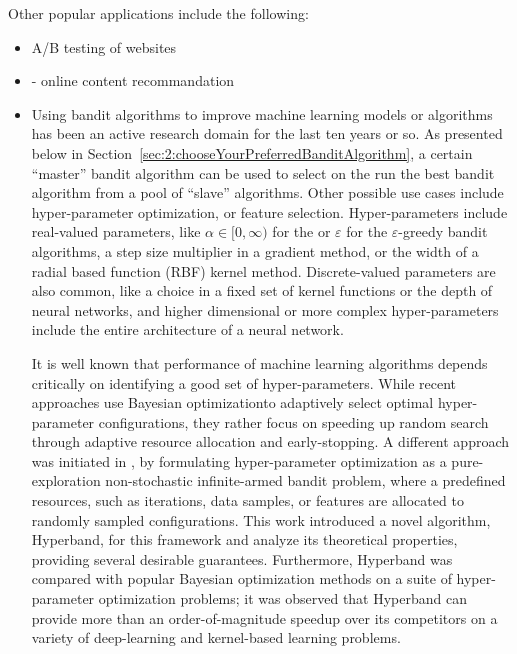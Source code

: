 Other popular applications include the following:
\begin{itemize}
    \item
    A/B testing of websites
    \cite{Kaufmann14,Jamieson17ABTest}

    \item
    - online content recommandation
    \cite{Li10,Louedec16}

    \item
    Using bandit algorithms to improve machine learning models or algorithms has been an active research domain for the last ten years or so.
    As presented below in Section~\ref{sec:2:chooseYourPreferredBanditAlgorithm}, a certain ``master'' bandit algorithm can be used to select on the run the best bandit algorithm from a pool of ``slave'' algorithms.
    Other possible use cases include hyper-parameter optimization, or feature selection.
    Hyper-parameters include real-valued parameters, like $\alpha\in[0,\infty)$ for the \UCB{} or $\varepsilon$ for the $\varepsilon$-greedy bandit algorithms, a step size multiplier in a gradient method, or the width of a radial based function (RBF) kernel method.
    Discrete-valued parameters are also common, like a choice in a fixed set of kernel functions or the depth of neural networks,
    and higher dimensional or more complex hyper-parameters include the entire architecture of a neural network.

    It is well known that performance of machine learning algorithms depends critically on identifying a good set of hyper-parameters.
    While recent approaches use Bayesian optimizationto adaptively select optimal hyper-parameter configurations, they rather focus on speeding up random search
    through adaptive resource allocation and early-stopping.
    A different approach was initiated in \cite{LiJamieson2018}, by formulating hyper-parameter optimization as a pure-exploration non-stochastic infinite-armed bandit problem, where a predefined resources, such as iterations, data samples, or features are allocated to randomly sampled configurations. This work introduced a novel algorithm, Hyperband, for this framework and analyze its theoretical properties, providing several desirable guarantees.
    Furthermore, Hyperband was compared with popular Bayesian optimization methods on a suite of hyper-parameter optimization problems; it was observed that Hyperband can provide more than an order-of-magnitude speedup over its competitors on a variety of deep-learning and kernel-based learning problems.

\end{itemize}

